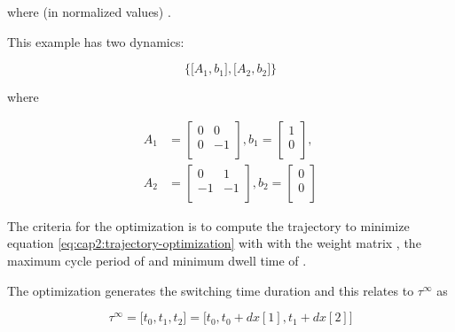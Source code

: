 \noindent
where (in normalized values) . 

This example has two dynamics:

\noindent
\begin{equation}
    \Big\{\big[A_1,b_1\big], \big[A_2,b_2\big]\Big\}
\end{equation}

\noindent
where

\noindent
\begin{align}
    A_1 &= \left[
        \begin{matrix}
            0 & 0 \\ 
            0 & -1 \\ 
        \end{matrix}
    \right],
    b_1 = \left[
        \begin{matrix}
            1 \\ 
            0 \\ 
        \end{matrix}
    \right], \\
    A_2 &= \left[
        \begin{matrix}
            0 & 1 \\ 
            -1 & -1 \\ 
        \end{matrix}
    \right],
    b_2 = \left[
        \begin{matrix}
            0 \\ 
            0 \\ 
        \end{matrix}
    \right]
\end{align}



The criteria for the optimization is to compute the trajectory to minimize equation \eqref{eq:cap2:trajectory-optimization} 
with  with the weight matrix 
, the maximum cycle period of 
 and minimum dwell time of .


The optimization generates the switching time duration and this relates to $\tau^\infty$ as

\noindent
\begin{equation}
    \tau^\infty = \Big[t_0, t_1, t_2\Big] = \Big[t_0, t_0 + dx[1], t_1 + dx[2]\Big]
\end{equation}

